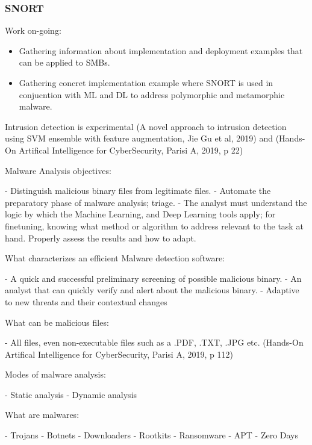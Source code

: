 \subsubsection{SNORT}

\begin{notes}

    Work on-going:

    \begin{itemize}
        \item Gathering information about implementation and deployment examples that can be applied to SMBs.
        \item Gathering concret implementation example where SNORT is used in conjucntion with ML and DL to address polymorphic and metamorphic malware.\\
    \end{itemize}
    
\end{notes}


Intrusion detection is experimental (A novel approach to intrusion detection using
SVM ensemble with feature augmentation, Jie Gu et al, 2019) and (Hands-On Artifical Intelligence for CyberSecurity, Parisi A, 2019, p 22)


Malware Analysis objectives:

- Distinguish malicious binary files from legitimate files.
- Automate the preparatory phase of malware analysis; triage.
- The analyst must understand the logic by which the Machine Learning, and Deep Learning tools apply; for finetuning, knowing what method or algorithm to address relevant to the task at hand. Properly assess the results and how to adapt.

What characterizes an efficient Malware detection software:

- A quick and successful preliminary screening of possible malicious binary.
- An analyst that can quickly verify and alert about the malicious binary.
- Adaptive to new threats and their contextual changes

What can be malicious files:

- All files, even non-executable files such as a .PDF, .TXT, .JPG etc. (Hands-On Artifical Intelligence for CyberSecurity, Parisi A, 2019, p 112)

Modes of malware analysis:

- Static analysis
- Dynamic analysis


What are malwares:

- Trojans
- Botnets
- Downloaders
- Rootkits
- Ransomware
- APT
- Zero Days

